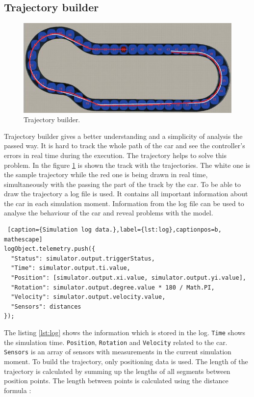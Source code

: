 \subsection{Trajectory builder}
\begin{figure}[h!]
    \centering
    \includegraphics[width=\linewidth]{src/pic/trajectory}
    \caption{Trajectory builder.}
    \label{fig:trajectory}
\end{figure}
Trajectory builder gives a better understanding and a simplicity of analysis the passed way. It is hard to track the whole path of the car and see the controller's errors in real time during the execution. The trajectory helps to solve this problem. In the figure \ref{fig:trajectory} is shown the track with the trajectories. The white one is the sample trajectory while the red one is being drawn in real time, simultaneously with the passing the part of the track by the car. To be able to draw the trajectory a log file is used. It contains all important information about the car in each simulation moment. Information from the log file can be used to analyse the behaviour of the car and reveal problems with the model. 
\bigskip
\begin{lstlisting} [caption={Simulation log data.},label={lst:log},captionpos=b, mathescape]
logObject.telemetry.push({
  "Status": simulator.output.triggerStatus,
  "Time": simulator.output.ti.value,
  "Position": [simulator.output.xi.value, simulator.output.yi.value],
  "Rotation": simulator.output.degree.value * 180 / Math.PI,
  "Velocity": simulator.output.velocity.value,
  "Sensors": distances
});
\end{lstlisting}
\bigskip
The listing \ref{lst:log} shows the information which is stored in the log. \texttt{Time} shows the simulation time. \texttt{Position}, \texttt{Rotation} and \texttt{Velocity} related to the car. \texttt{Sensors} is an array of sensors with measurements in the current simulation moment. To build the trajectory, only positioning data is used. The length of the trajectory is calculated by summing up the lengths of all segments between position points. The length between points is calculated using the distance formula \cite{Distance}:
